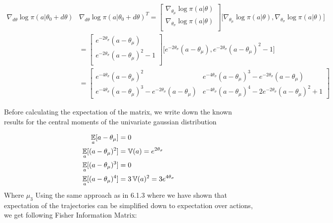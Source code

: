 \documentclass{exam}
\begin{document}
\begin{enumerate}
\begin{solutionorlines}[2in]
            \begin{align*}
                \nabla_{d\theta} \log \pi(a | \theta_0 + d\theta) &\nabla_{d\theta} \log \pi(a | \theta_0 + d\theta)^T = \begin{bmatrix}
                    \nabla_{\theta_\mu} \log \pi(a | \theta) \\
                    \nabla_{\theta_\sigma} \log \pi(a | \theta) \\
                \end{bmatrix} \big[ \nabla_{\theta_\mu} \log \pi(a | \theta), \nabla_{\theta_\sigma} \log \pi(a | \theta) \big] \\
                &= \begin{bmatrix}
                    e^{-2\theta_\sigma}(a - \theta_{\mu}) \\
                    e^{-2\theta_\sigma}(a - \theta_{\mu})^2 - 1  \\
                \end{bmatrix} \big[ e^{-2\theta_\sigma}(a - \theta_{\mu}), e^{-2\theta_\sigma}(a - \theta_{\mu})^2 - 1 \big] \\
                &= \begin{bmatrix}
                    e^{-4\theta_\sigma}(a - \theta_{\mu})^2  & e^{-4\theta_\sigma}(a - \theta_{\mu})^3 - e^{-2\theta_\sigma}(a - \theta_{\mu}) \\
                    e^{-4\theta_\sigma}(a - \theta_{\mu})^3 - e^{-2\theta_\sigma}(a - \theta_{\mu})   & e^{-4\theta_\sigma}(a - \theta_{\mu})^4 -2 e^{-2\theta_\sigma}(a - \theta_{\mu})^2 +1
                \end{bmatrix}
            \end{align*}
            
            
            Before calculating the expectation of the matrix, we write down the known results for the central moments of the univariate gaussian distribution
            
            \begin{align*}
                \operatorname*{\mathbb{E}}_a [a - \theta_\mu] &=  0 \\
                \operatorname*{\mathbb{E}}_a [(a - \theta_\mu)^2] &= \operatorname*{\mathbb{V}}(a) = e^{2\theta_{\sigma}}\\
                \operatorname*{\mathbb{E}}_a [(a - \theta_{\mu})^3] &= 0 \\
                \operatorname*{\mathbb{E}}_a [(a - \theta_{\mu})^4] &= 3 \operatorname*{\mathbb{V}}(a)^2 = 3 e^{4\theta_{\sigma}}\\
            \end{align*}
            Where $\mu_3$
            Using the same approach as in 6.1.3 where we have shown that expectation of the trajectories can be simplified down to expectation over actions, we get following Fisher Information Matrix:
            

\end{solutionorlines}
\end{enumerate}
\end{document}
